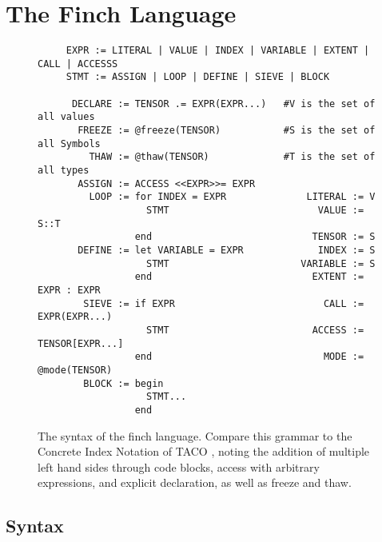 \vspace{12pt}
\section{The Finch Language}

\begin{wrapfigure}{R}{0.51\linewidth}
    \vspace{-28pt}
    \begin{verbatim}
     EXPR := LITERAL | VALUE | INDEX | VARIABLE | EXTENT | CALL | ACCESSS
     STMT := ASSIGN | LOOP | DEFINE | SIEVE | BLOCK

      DECLARE := TENSOR .= EXPR(EXPR...)   #V is the set of all values
       FREEZE := @freeze(TENSOR)           #S is the set of all Symbols
         THAW := @thaw(TENSOR)             #T is the set of all types                                      
       ASSIGN := ACCESS <<EXPR>>= EXPR    
         LOOP := for INDEX = EXPR              LITERAL := V                           
                   STMT                          VALUE := S::T                        
                 end                            TENSOR := S                            
       DEFINE := let VARIABLE = EXPR             INDEX := S                            
                   STMT                       VARIABLE := S                            
                 end                            EXTENT := EXPR : EXPR                  
        SIEVE := if EXPR                          CALL := EXPR(EXPR...)                
                   STMT                         ACCESS := TENSOR[EXPR...]              
                 end                              MODE := @mode(TENSOR)                
        BLOCK := begin                     
                   STMT...                 
                 end                        
    \end{verbatim}                                                 
    \vspace{-12pt}
\caption{The syntax of the finch language. Compare this grammar to the Concrete
Index Notation of TACO \cite[Figure~3]{kjolstad_tensor_2019}, noting the
addition of multiple left hand sides through code blocks, access with arbitrary expressions, and explicit declaration, as well as freeze and thaw.}\label{fig:syntax}
\vspace{-12pt}
\end{wrapfigure}

\subsection{Syntax}

